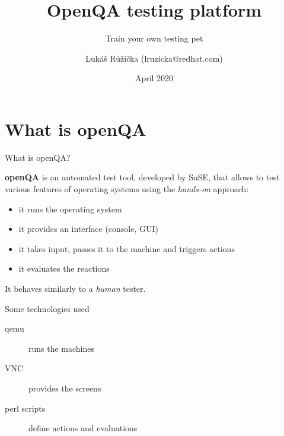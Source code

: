 \documentclass[12pt,aspectratio=169]{beamer}
\begin{document}
	\author{Lukáš Růžička (lruzicka@redhat.com)}
	\title{OpenQA testing platform}
	\subtitle{Train your own testing pet}
	\date{April 2020}

\begin{frame}[plain]
	\maketitle 
\end{frame}

\section{What is openQA}

\begin{frame}{What is openQA?}

\textbf{openQA} is an automated test tool, developed by SuSE, that allows to test various features of operating systems using the \textit{hands-on} approach:

\vspace{15pt}

\begin{itemize}
\item it runs the operating system
\item it provides an interface (console, GUI)
\item it takes input, passes it to the machine and triggers actions
\item it evaluates the reactions
\end{itemize}

\vspace{15pt}

It behaves similarly to a \textit{human} tester.
\end{frame}

\begin{frame}{Some technologies used}
	
	\begin{description}
		\item[qemu] runs the machines
		\item[VNC] provides the screens
		\item[perl scripts] define actions and evaluations
	\end{description}
\end{frame}
\end{document}
